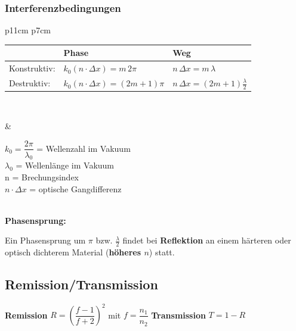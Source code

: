 \subsubsection{Interferenzbedingungen}
\begin{tabular}{p{11cm} p{7cm}}
\begin{minipage}[]{11cm}
	\begin{tabular}{|l|l|l|}
	\hline
	& \textbf{Phase} & \textbf{Weg} \\
	\hline
	Konstruktiv: 
		& $k_0(n\cdot \Delta x)=m \, 2\pi$
		& $n \, \Delta x = m \, \lambda$ \\
	Destruktiv: 
	 	& $k_0(n\cdot \Delta x)=(2m+1)\pi$
	 	& $n \, \Delta x = (2m+1) \frac{\lambda}{2}$ \\
	\hline
	\end{tabular}\\
	\end{minipage}
	& \parbox{6cm}{$k_0 = \dfrac{2\pi}{\lambda_0}$ = Wellenzahl im Vakuum\\
	$ \lambda_0$ = Wellenlänge im Vakuum\\
	n = Brechungsindex\\
	$n\cdot \Delta x$ = optische Gangdifferenz}
\end{tabular}\\
\textbf{Phasensprung:}
		\parbox{16cm}{Ein Phasensprung um $\pi$ bzw. $\frac{\lambda}{2}$ findet bei
		\textbf{Reflektion} an einem härteren oder optisch dichterem Material
		(\textbf{höheres $n$}) statt.}
		
\subsection{Remission/Transmission}
\textbf{Remission} $R= \left(\dfrac{f-1}{f+2}\right)^2$ mit $ f = \dfrac{n_1}{n_2}$\hspace{2cm} \textbf{Transmission} $T = 1-R$  

